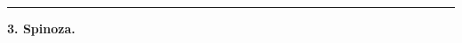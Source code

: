 \documentclass[12pt,a4paper]{book}
\newcommand{\divrule}{\begin{center}\rule{2cm}{0.4pt}\end{center}}
\begin{document}
\divrule

\begin{center}
  \textbf{3. Spinoza.}
\end{center}
\end{document}
